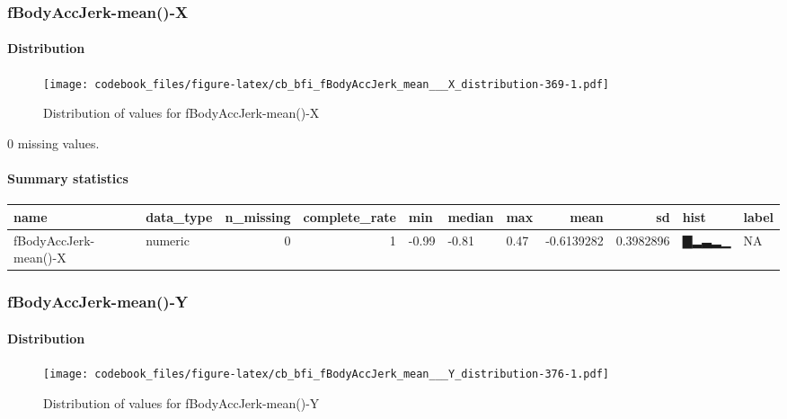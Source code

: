 \documentclass[
]{article}
\begin{document}
\hypertarget{fBodyAccJerk_mean___X}{%
\subsubsection{fBodyAccJerk-mean()-X}\label{fBodyAccJerk_mean___X}}

\hypertarget{fBodyAccJerk_mean___X_distribution}{%
\paragraph{Distribution}\label{fBodyAccJerk_mean___X_distribution}}

\begin{figure}
\centering
\texttt{[image: codebook\_files/figure-latex/cb\_bfi\_fBodyAccJerk\_mean\_\_\_X\_distribution-369-1.pdf]}
\caption{Distribution of values for fBodyAccJerk-mean()-X}
\end{figure}

0 missing values.

\hypertarget{fBodyAccJerk_mean___X_summary}{%
\paragraph{Summary statistics}\label{fBodyAccJerk_mean___X_summary}}

\begin{longtable}[]{@{}llrrlllrrll@{}}
\toprule
name & data\_type & n\_missing & complete\_rate & min & median & max &
mean & sd & hist & label \\
\midrule
\endhead
fBodyAccJerk-mean()-X & numeric & 0 & 1 & -0.99 & -0.81 & 0.47 &
-0.6139282 & 0.3982896 & ▇▂▃▂▁ & NA \\
\bottomrule
\end{longtable}

\hypertarget{fBodyAccJerk_mean___Y}{%
\subsubsection{fBodyAccJerk-mean()-Y}\label{fBodyAccJerk_mean___Y}}

\hypertarget{fBodyAccJerk_mean___Y_distribution}{%
\paragraph{Distribution}\label{fBodyAccJerk_mean___Y_distribution}}

\begin{figure}
\centering
\texttt{[image: codebook\_files/figure-latex/cb\_bfi\_fBodyAccJerk\_mean\_\_\_Y\_distribution-376-1.pdf]}
\caption{Distribution of values for fBodyAccJerk-mean()-Y}
\end{figure}
\end{document}
